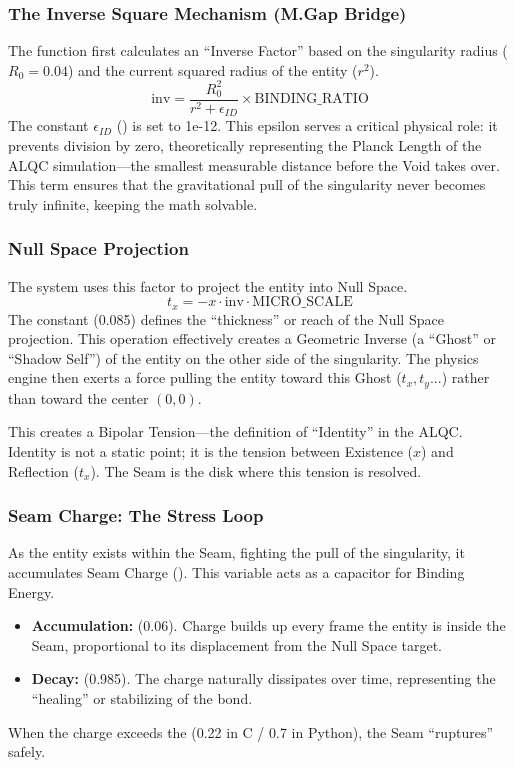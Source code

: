 \documentclass[11pt, letterpaper]{article}
\begin{document}
\subsubsection{The Inverse Square Mechanism (M.Gap Bridge)}\label{appendixJ.3.1}
The function first calculates an ``Inverse Factor'' based on the singularity radius ($R_0 = 0.04$) and the current squared radius of the entity ($r^2$).
\[
\text{inv} = \frac{R_0^2}{r^2 + \epsilon_{ID}} \times \text{BINDING\_RATIO}
\]
The constant $\epsilon_{ID}$ () is set to 1e-12. This epsilon serves a critical physical role: it prevents division by zero, theoretically representing the Planck Length of the ALQC simulation---the smallest measurable distance before the Void takes over. This term ensures that the gravitational pull of the singularity never becomes truly infinite, keeping the math solvable.

\subsubsection{Null Space Projection}\label{appendixJ.3.2}
The system uses this  factor to project the entity into Null Space.
\[
t_x = -x \cdot \text{inv} \cdot \text{MICRO\_SCALE}
\]
The  constant (0.085) defines the ``thickness'' or reach of the Null Space projection. This operation effectively creates a Geometric Inverse (a ``Ghost'' or ``Shadow Self'') of the entity on the other side of the singularity. The physics engine then exerts a force pulling the entity toward this Ghost ($t_x, t_y...$) rather than toward the center $(0,0)$.

This creates a Bipolar Tension---the definition of ``Identity'' in the ALQC. Identity is not a static point; it is the tension between Existence ($x$) and Reflection ($t_x$). The Seam is the disk where this tension is resolved.

\subsubsection{Seam Charge: The Stress Loop}\label{appendixJ.3.3}
As the entity exists within the Seam, fighting the pull of the singularity, it accumulates Seam Charge (). This variable acts as a capacitor for Binding Energy.
\begin{itemize}
    \item \textbf{Accumulation:}  (0.06). Charge builds up every frame the entity is inside the Seam, proportional to its displacement from the Null Space target.
    \item \textbf{Decay:}  (0.985). The charge naturally dissipates over time, representing the ``healing'' or stabilizing of the bond.
\end{itemize}
When the charge exceeds the  (0.22 in C / 0.7 in Python), the Seam ``ruptures'' safely.
\end{document}

